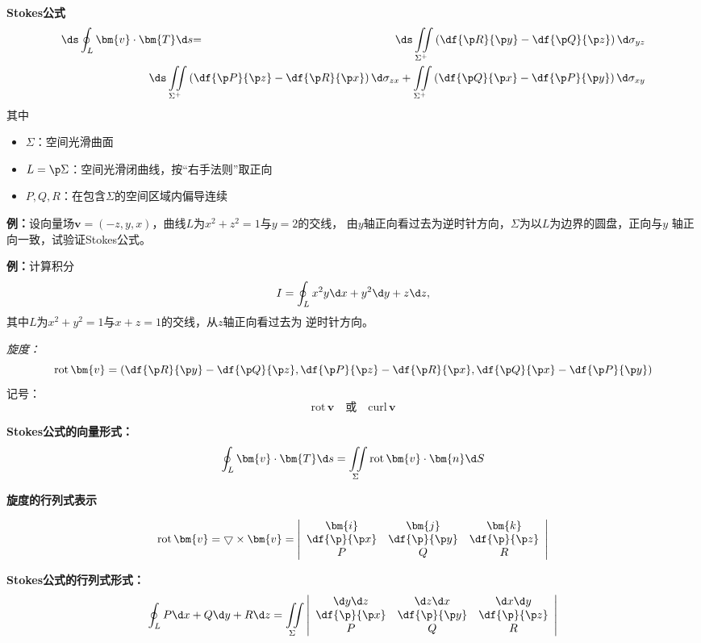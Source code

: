 \begin{thx}
	{\bf Stokes公式}
	\begin{eqnarray*}
		{\ds\oint_L\bm{v}\cdot\bm{T}\d s}&{=}&
		{\ds\iint\limits_{\Sigma^+}\left(\df{\p R}{\p y}-\df{\p Q}{\p
		z}\right)\d\sigma_{yz}}\\ 
		&& {\hspace{-2cm}\ds\iint\limits_{\Sigma^+}\left(\df{\p P}{\p
		z}-\df{\p R}{\p x}\right)\d\sigma_{zx}
		+\iint\limits_{\Sigma^+}\left(\df{\p Q}{\p x}-\df{\p P}{\p
		y}\right)\d\sigma_{xy}}
	\end{eqnarray*}
	其中
	\begin{itemize}
	  \item {$\Sigma$：}空间光滑曲面
	  \item {$L=\p\Sigma$：}空间光滑闭曲线，按{“右手法则”}取正向
	  \item {$P,Q,R$：}在包含$\Sigma$的空间区域内偏导连续
	\end{itemize}
\end{thx}


{\bf 例：}设向量场$\bm{v}=(-z,y,x)$，曲线$L$为$x^2+z^2=1$与$y=2$的交线，
由$y$轴正向看过去为逆时针方向，$\Sigma$为以$L$为边界的圆盘，正向与$y$
轴正向一致，试验证Stokes公式。

{\bf 例：}计算积分
$$I=\oint_Lx^2y\d x+y^2\d y+z\d z,$$
其中$L$为$x^2+y^2=1$与$x+z=1$的交线，从$z$轴正向看过去为
逆时针方向。

{\it 旋度：}
$${\mathrm{rot}\,\bm{v}=\left(
\df{\p R}{\p y}-\df{\p Q}{\p z},
\df{\p P}{\p z}-\df{\p R}{\p x},
\df{\p Q}{\p x}-\df{\p P}{\p y}
\right)}$$ 
{记号：}
$$\mathrm{rot}\,\bm{v}\quad \mbox{或}\quad\mathrm{curl}\,\bm{v}$$ 

{\bf Stokes公式的向量形式：}
$${\oint_L\bm{v}\cdot\bm{T}\d s
=\iint\limits_{\Sigma}\mathrm{rot}\,\bm{v}\cdot\bm{n}\d S}$$

{\bf 旋度的行列式表示}

$${\mathrm{rot}\,\bm{v}=\bigtriangledown\times\bm{v} 
=\left|\begin{array}{ccc}
	\bm{i} & \bm{j} & \bm{k}\\
	\df{\p}{\p x} & \df{\p}{\p y} & \df{\p}{\p z}\\
	P & Q & R
\end{array}\right|}$$ 

{\bf Stokes公式的行列式形式：} 
$${\oint_LP\d x+Q\d y+R\d z=\iint\limits_{\Sigma}
\left|\begin{array}{ccc}
	\d y\d z & \d z\d x & \d x\d y\\
	\df{\p}{\p x} & \df{\p}{\p y} & \df{\p}{\p z}\\
	P & Q & R
\end{array}\right|}$$

